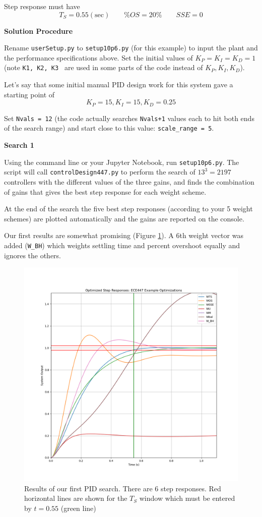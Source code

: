 Step response must have
\[
T_S = 0.55 \mathrm{(sec)} \qquad  \%OS = 20\% \qquad    SSE = 0
\]


{\bf Solution Procedure}

Rename {\tt userSetup.py} to {\tt setup10p6.py} (for this example)
to input the plant and the performance specifications above.
Set the initial values of $K_P= K_I=K_D=1$
(note {\tt K1, K2, K3 } are used in some parts of the
code instead of $K_P, K_I, K_D$).

Let's say that some initial manual PID design work for this system gave a starting point of
 \[
 K_P = 15, K_I= 15, K_D=0.25
 \]

Set {\tt Nvals = 12}  (the code actually searches {\tt Nvals+1} values each to hit both ends of the
search range) and start close to this value: {\tt scale\_range = 5}.

{\bf Search 1}

Using the command line or your Jupyter Notebook, run {\tt setup10p6.py}.
The script will call {\tt controlDesign447.py} to perform the search of $13^3 = 2197$
controllers with the different values of the three gains, and finds the
combination of gains that gives the best step response for each weight scheme.

At the end of the search the five best step responses
(according to your 5 weight schemes)
are plotted automatically and the gains are reported on the console.

Our first results are somewhat promising (Figure \ref{PIDsearchV1x5}).
A 6th weight vector was added ({\tt W\_BH}) which weights settling time and percent overshoot
equally and ignores the others.

\begin{figure}\centering
  \includegraphics[width=4.5in]{figs10/S43Q01.png}
  \caption{Results of our first PID search.   There are 6 step responses.
  Red horizontal lines are shown for the $T_S$ window which must be entered by
  $t=0.55$ (green line)}\label{PIDsearchV1x5}
\end{figure}

